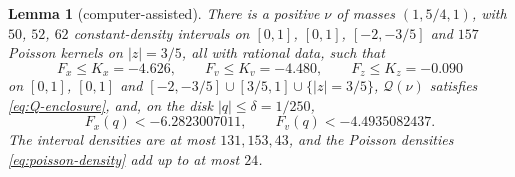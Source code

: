 \documentclass{amsart}
\newtheorem{lemma}{Lemma}[section]
\numberwithin{equation}{section}
\numberwithin{table}{section}
\begin{document}
\begin{lemma}[computer-assisted]\label{lem:reference-bound}
There is a positive $\nu$ of masses $(1,5/4,1)$, with $50$, $52$, $62$
constant-density intervals on $[0,1]$, $[0,1]$, $[-2,-3/5]$ and $157$
Poisson kernels on $|z|=3/5$, all with rational data, such that
\begin{equation*}
 F_x\le K_x=-4.626,\qquad F_v\le K_v=-4.480,
 \qquad F_z\le K_z=-0.090
\end{equation*}
on $[0,1]$, $[0,1]$ and $[-2,-3/5]\cup[3/5,1]\cup\{|z|=3/5\}$, $\mathcal Q(\nu)$
satisfies \eqref{eq:Q-enclosure}, and, on the disk $|q|\le\delta=1/250$,
\begin{equation}\label{eq:endpoint-bounds}
 F_x(q)<-6.2823007011,\qquad F_v(q)<-4.4935082437.
\end{equation}
The interval densities are at most $131,153,43$, and the Poisson densities
\eqref{eq:poisson-density} add up to at most $24$.
\end{lemma}
\end{document}
